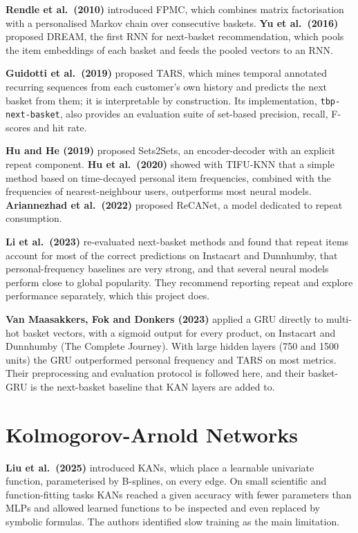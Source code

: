 \documentclass[12pt,a4paper]{report}
\begin{document}
\textbf{Rendle et al.\ (2010)} \cite{rendle2010} introduced FPMC, which combines
matrix factorisation with a personalised Markov chain over consecutive baskets.
\textbf{Yu et al.\ (2016)} \cite{yu2016} proposed DREAM, the first RNN for
next-basket recommendation, which pools the item embeddings of each basket and
feeds the pooled vectors to an RNN.

\textbf{Guidotti et al.\ (2019)} \cite{guidotti2019} proposed TARS, which mines
temporal annotated recurring sequences from each customer's own history and
predicts the next basket from them; it is interpretable by construction. Its
implementation, \texttt{tbp-next-basket}, also provides an evaluation suite of
set-based precision, recall, F-scores and hit rate.

\textbf{Hu and He (2019)} \cite{hu2019} proposed Sets2Sets, an encoder-decoder
with an explicit repeat component. \textbf{Hu et al.\ (2020)} \cite{hu2020}
showed with TIFU-KNN that a simple method based on time-decayed personal item
frequencies, combined with the frequencies of nearest-neighbour users,
outperforms most neural models. \textbf{Ariannezhad et al.\ (2022)}
\cite{ariannezhad2022} proposed ReCANet, a model dedicated to repeat
consumption.

\textbf{Li et al.\ (2023)} \cite{li2023} re-evaluated next-basket methods and
found that repeat items account for most of the correct predictions on Instacart
and Dunnhumby, that personal-frequency baselines are very strong, and that
several neural models perform close to global popularity. They recommend
reporting repeat and explore performance separately, which this project does.

\textbf{Van Maasakkers, Fok and Donkers (2023)} \cite{vanmaasakkers2023} applied
a GRU directly to multi-hot basket vectors, with a sigmoid output for every
product, on Instacart and Dunnhumby (The Complete Journey). With large hidden
layers (750 and 1500 units) the GRU outperformed personal frequency and TARS on
most metrics. Their preprocessing and evaluation protocol is followed here, and
their basket-GRU is the next-basket baseline that KAN layers are added to.

\section{Kolmogorov-Arnold Networks}

\textbf{Liu et al.\ (2025)} \cite{liu2025kan} introduced KANs, which place a
learnable univariate function, parameterised by B-splines, on every edge. On
small scientific and function-fitting tasks KANs reached a given accuracy with
fewer parameters than MLPs and allowed learned functions to be inspected and
even replaced by symbolic formulas. The authors identified slow training as the
main limitation.
\end{document}
